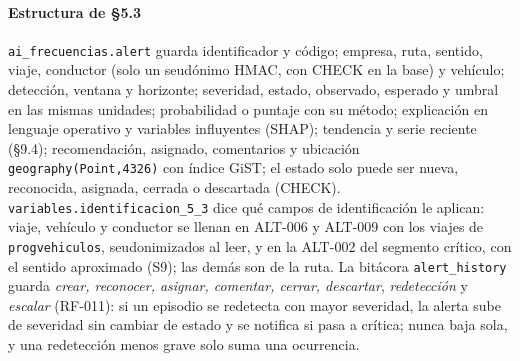 \documentclass[10pt,a4paper]{article}
\begin{document}
\paragraph{Estructura de §5.3} \texttt{ai\_frecuencias.alert} guarda identificador y código; empresa, ruta, sentido,
viaje, conductor (solo un seudónimo HMAC, con CHECK en la base) y vehículo; detección, ventana y horizonte; severidad,
estado, observado, esperado y umbral en las mismas unidades; probabilidad o puntaje con su método; explicación en
lenguaje operativo y variables influyentes (SHAP); tendencia y serie reciente (§9.4); recomendación, asignado,
comentarios y ubicación \texttt{geography(Point,4326)} con índice GiST; el estado solo puede ser nueva, reconocida,
asignada, cerrada o descartada (CHECK). \texttt{variables.identificacion\_5\_3} dice qué campos de identificación le
aplican: viaje, vehículo y conductor se llenan en ALT-006 y ALT-009 con los viajes de \texttt{progvehiculos},
seudonimizados al leer, y en la ALT-002 del segmento crítico, con el sentido aproximado (S9); las demás son de la ruta.
 La bitácora \texttt{alert\_history} guarda \emph{crear, reconocer,
asignar, comentar, cerrar, descartar}, \emph{redetección} y \emph{escalar} (RF-011): si un episodio se redetecta con
mayor severidad, la alerta sube de severidad sin cambiar de estado y se notifica si pasa a crítica; nunca baja sola, y
una redetección menos grave solo suma una ocurrencia.
\end{document}
